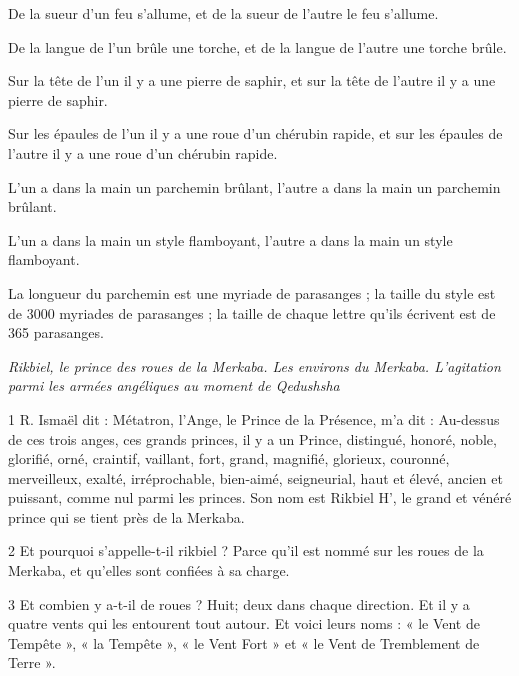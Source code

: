 \par De la sueur d'un feu s'allume, et de la sueur de l'autre le feu s'allume.

\par De la langue de l'un brûle une torche, et de la langue de l'autre une torche brûle.

\par Sur la tête de l'un il y a une pierre de saphir, et sur la tête de l'autre il y a une pierre de saphir.

\par Sur les épaules de l'un il y a une roue d'un chérubin rapide, et sur les épaules de l'autre il y a une roue d'un chérubin rapide.

\par L'un a dans la main un parchemin brûlant, l'autre a dans la main un parchemin brûlant.

\par L'un a dans la main un style flamboyant, l'autre a dans la main un style flamboyant.

\par La longueur du parchemin est une myriade de parasanges ; la taille du style est de 3000 myriades de parasanges ; la taille de chaque lettre qu’ils écrivent est de 365 parasanges.


\par \textit{Rikbiel, le prince des roues de la Merkaba. Les environs du Merkaba. L'agitation parmi les armées angéliques au moment de Qedushsha}

\par 1 R. Ismaël dit : Métatron, l'Ange, le Prince de la Présence, m'a dit : Au-dessus de ces trois anges, ces grands princes, il y a un Prince, distingué, honoré, noble, glorifié, orné, craintif, vaillant, fort, grand, magnifié, glorieux, couronné, merveilleux, exalté, irréprochable, bien-aimé, seigneurial, haut et élevé, ancien et puissant, comme nul parmi les princes. Son nom est Rikbiel H', le grand et vénéré prince qui se tient près de la Merkaba.

\par 2 Et pourquoi s'appelle-t-il rikbiel ? Parce qu'il est nommé sur les roues de la Merkaba, et qu'elles sont confiées à sa charge.

\par 3 Et combien y a-t-il de roues ? Huit; deux dans chaque direction. Et il y a quatre vents qui les entourent tout autour. Et voici leurs noms : « le Vent de Tempête », « la Tempête », « le Vent Fort » et « le Vent de Tremblement de Terre ».

